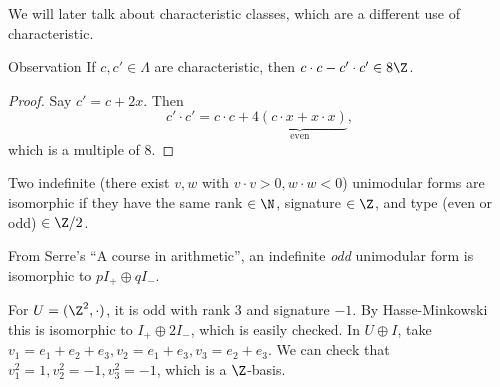 We will later talk about characteristic classes, which are a different use of characteristic.
\begin{namedthing}{Observation} 
If $c, c' \in \Lambda$ are characteristic, then $c \cdot  c - c' \cdot  c' \in 8 \Z$.
\end{namedthing}
\begin{proof}
    Say $c' = c + 2x$. Then \[
        c' \cdot  c' = c \cdot  c + \underset{\text{even} }{\underbrace{4( c \cdot  x + x \cdot  x)}} ,
    \] which is a multiple of 8.
\end{proof}
\begin{theorem}
    Two indefinite (there exist $v,w$ with $v \cdot  v >0,w \cdot  w <0$) unimodular forms are isomorphic if they have the same rank $\in  \N$, signature $\in \Z$, and type (even or odd) $\in \Z/2$.
\end{theorem}
From Serre's ``A course in arithmetic'', an indefinite \emph{odd} unimodular form is isomorphic to $p I_+ \oplus q I_-$.
 \begin{example}
     For $U = (\Z ^2, \cdot )$, it is odd with rank 3 and signature $-1$. By Hasse-Minkowski this is isomorphic to $I_+\oplus 2 I_-$, which is easily checked. In $U\oplus I$, take $v_1 = e_1+e_2+e_3,v_2=e_1+e_3,v_3=e_2+e_3$.  We can check that $v_1^2=1,v_2^2=-1, v_3^2=-1$, which is a $\Z$-basis.
\end{example}

